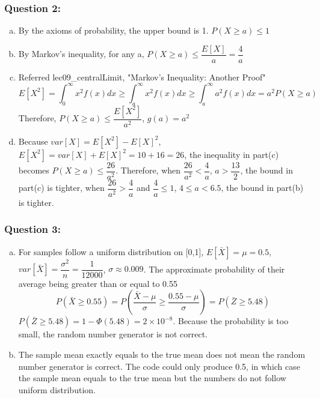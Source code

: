 \documentclass[12pt]{article}
\begin{document}
\subsubsection*{Question 2:} 
\begin{enumerate}[a)]
  \item 
  By the axioms of probability, the upper bound is 1. $P(X \geq a) \leq 1$
  
  \item 
  By Markov's inequality, for any a, $P(X \geq a) \leq \dfrac{E[X]}{a}=\dfrac{4}{a}$
  
  \item 
  Referred lec09\_centralLimit, "Markov’s Inequality: Another Proof"
  \begin{equation*}
  E[X^2]=\int_{0}^{\infty}x^2f(x)dx \geq \int_{a}^{\infty}x^2f(x)dx \geq \int_{a}^{\infty}a^2f(x)dx = a^2P(X \geq a)
  \end{equation*}
  Therefore, $P(X \geq a) \leq \dfrac{E[X^2]}{a^2}$, $g(a)=a^2$
  
  \item 
  Because $var[X]=E[X^2]-E[X]^2$, $E[X^2]=var[X]+E[X]^2=10+16=26$, the inequality in part(c) becomes $P(X \geq a) \leq \dfrac{26}{a^2}$. Therefore, when $\dfrac{26}{a^2} < \dfrac{4}{a}$, $a>\dfrac{13}{2}$, the bound in part(c) is tighter, when $\dfrac{26}{a^2} > \dfrac{4}{a}$ and $\dfrac{4}{a} \leq 1$, $4 \leq a<6.5$, the bound in part(b) is tighter. 



\end{enumerate}


\subsubsection*{Question 3:} 
\begin{enumerate}[a)]
  \item 
  For samples follow a uniform distribution on [0,1], $E[\bar{X}] = \mu = 0.5 $, $var[\bar{X}]=\dfrac{\sigma^2}{n} = \dfrac{1}{12000}$, $\sigma \approx 0.009$. The approximate probability of their average being greater than or equal to 0.55 
  \begin{equation*}
  P(\bar{X}\geq 0.55)=P(\dfrac{\bar{X}-\mu}{\sigma}\geq \dfrac{0.55-\mu}{\sigma})=P(\bar{Z}\geq 5.48)
  \end{equation*}
  $P(\bar{Z}\geq 5.48) = 1-\Phi(5.48)=2\times 10^{-8}$. Because the probability is too small, the random number generator is not correct. 
  \item 
  The sample mean exactly equals to the true mean does not mean the random number generator is correct. The code could only produce 0.5, in which case the sample mean equals to the true mean but the numbers do not follow uniform distribution. 


\end{enumerate}
\end{document}
